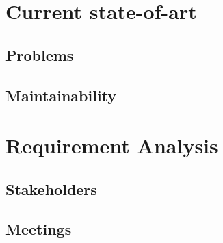 \section{Current state-of-art}

\subsection{Problems}


\subsection{Maintainability}
\section{Requirement Analysis}
\subsection{Stakeholders}
\subsection{Meetings}
     